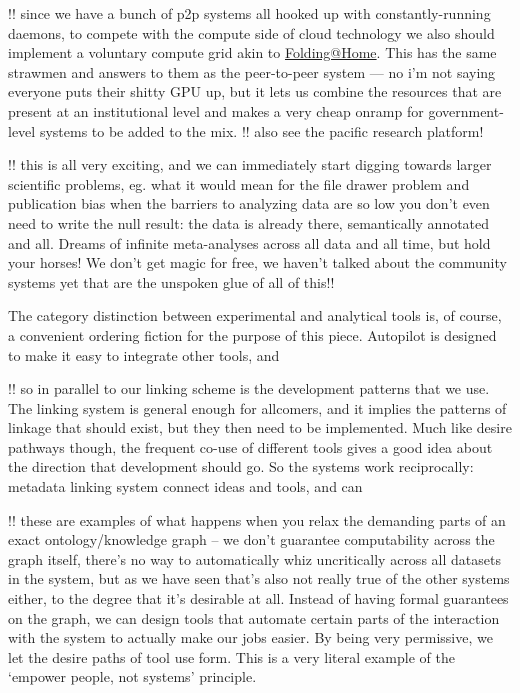 \documentclass[10pt]{article}
\begin{document}
\begin{multicols}{2}
!! since we have a bunch of p2p systems all hooked up with
constantly-running daemons, to compete with the compute side of cloud
technology we also should implement a voluntary compute grid akin to
\href{https://foldingathome.org/}{Folding@Home}. This has the same
strawmen and answers to them as the peer-to-peer system --- no i'm not
saying everyone puts their shitty GPU up, but it lets us combine the
resources that are present at an institutional level and makes a very
cheap onramp for government-level systems to be added to the mix. !!
also see the pacific research platform!

!! this is all very exciting, and we can immediately start digging
towards larger scientific problems, eg. what it would mean for the file
drawer problem and publication bias when the barriers to analyzing data
are so low you don't even need to write the null result: the data is
already there, semantically annotated and all. Dreams of infinite
meta-analyses across all data and all time, but hold your horses! We
don't get magic for free, we haven't talked about the community systems
yet that are the unspoken glue of all of this!!

The category distinction between experimental and analytical tools is,
of course, a convenient ordering fiction for the purpose of this piece.
Autopilot is designed to make it easy to integrate other tools, and \cite{kaneRealtimeLowlatencyClosedloop2020} 

!! so in parallel to our linking scheme is the development patterns that
we use. The linking system is general enough for allcomers, and it
implies the patterns of linkage that should exist, but they then need to
be implemented. Much like desire pathways though, the frequent co-use of
different tools gives a good idea about the direction that development
should go. So the systems work reciprocally: metadata linking system
connect ideas and tools, and can

!! these are examples of what happens when you relax the demanding parts
of an exact ontology/knowledge graph -- we don't guarantee computability
across the graph itself, there's no way to automatically whiz
uncritically across all datasets in the system, but as we have seen
that's also not really true of the other systems either, to the degree
that it's desirable at all. Instead of having formal guarantees on the
graph, we can design tools that automate certain parts of the
interaction with the system to actually make our jobs easier. By being
very permissive, we let the desire paths of tool use form. This is a
very literal example of the `empower people, not systems' principle.


\end{multicols}
\end{document}
